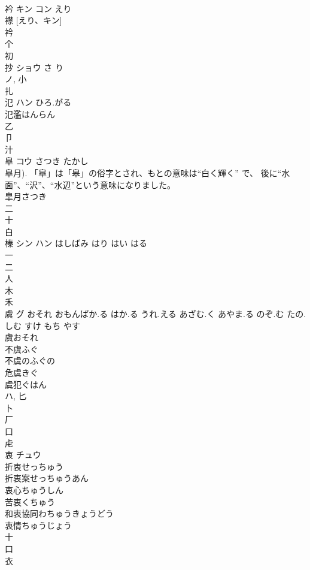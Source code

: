 \documentclass[8pt]{extreport}
\begin{document}
\begin{CJK}{UTF8}{min}
\\	衿	キン コン	えり	
\\	襟 [えり、キン] 
\\	衿 
\\	个 
\\	初 
\\	抄	ショウ	さ り	
\\	ノ, 小 
\\	扎	
\\	氾	ハン	ひろ.がる	
\\	氾濫はんらん 
\\	乙 
\\	卩 
\\	汁 
\\	皐	コウ	さつき たかし	
\\	皐月). 「皐」は「皋」の俗字とされ、もとの意味は“白く輝く” で、 後に“水面”、“沢”、“水辺”という意味になりました。
\\	皐月さつき 
\\	二 
\\	十 
\\	白 
\\	榛	シン ハン	はしばみ はり はい はる	
\\	一 
\\	二 
\\	人 
\\	木 
\\	禾 
\\	虞	グ	おそれ おもんぱか.る はか.る うれ.える あざむ.く あやま.る のぞ.む たの.しむ すけ もち やす	
\\	虞おそれ 
\\	不虞ふぐ 
\\	不虞のふぐの 
\\	危虞きぐ 
\\	虞犯ぐはん 
\\	ハ, 匕 
\\	卜 
\\	厂 
\\	口 
\\	虍 
\\	衷	チュウ		
\\	折衷せっちゅう 
\\	折衷案せっちゅうあん 
\\	衷心ちゅうしん 
\\	苦衷くちゅう 
\\	和衷協同わちゅうきょうどう 
\\	衷情ちゅうじょう 
\\	十 
\\	口 
\\	衣 

\end{CJK}
\end{document}
